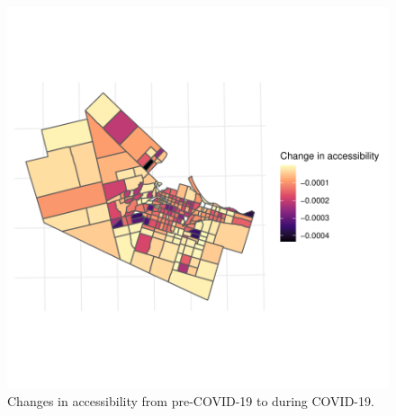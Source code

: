 \documentclass[]{elsarticle} %
\begin{document}
\begin{figure}

{\centering \includegraphics[width=1\linewidth]{Accessibility-Foodbanks-Hamilton_files/figure-latex/plot-accessibility-changes-1} 

}

\caption{\label{fig:accessibility-changes}Changes in accessibility from pre-COVID-19 to during COVID-19.}\label{fig:plot-accessibility-changes}
\end{figure}
\end{document}
